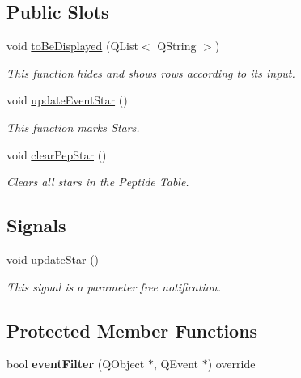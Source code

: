 \subsection*{Public Slots}
\begin{DoxyCompactItemize}
\item 
void \mbox{\hyperlink{class_peptide_view_a44ff37ec18e1e1c61c8747b6fe79e076}{to\+Be\+Displayed}} (Q\+List$<$ Q\+String $>$)
\begin{DoxyCompactList}\small\item\em This function hides and shows rows according to its input. \end{DoxyCompactList}\item 
void \mbox{\hyperlink{class_peptide_view_ab96162d2cb5e04591e6225505afceefe}{update\+Event\+Star}} ()
\begin{DoxyCompactList}\small\item\em This function marks Stars. \end{DoxyCompactList}\item 
\mbox{\label{class_peptide_view_ab2e4b1c394cd47afec35baceedf8be07}} 
void \mbox{\hyperlink{class_peptide_view_ab2e4b1c394cd47afec35baceedf8be07}{clear\+Pep\+Star}} ()
\begin{DoxyCompactList}\small\item\em Clears all stars in the Peptide Table. \end{DoxyCompactList}\end{DoxyCompactItemize}
\subsection*{Signals}
\begin{DoxyCompactItemize}
\item 
\mbox{\label{class_peptide_view_acaeeae28c65e40998f8b9f5eaf829f71}} 
void \mbox{\hyperlink{class_peptide_view_acaeeae28c65e40998f8b9f5eaf829f71}{update\+Star}} ()
\begin{DoxyCompactList}\small\item\em This signal is a parameter free notification. \end{DoxyCompactList}\end{DoxyCompactItemize}
\subsection*{Protected Member Functions}
\begin{DoxyCompactItemize}
\item 
\mbox{\label{class_peptide_view_a6c451e673bc3e13c3dfe1de10505f567}} 
bool {\bfseries event\+Filter} (Q\+Object $\ast$, Q\+Event $\ast$) override
\end{DoxyCompactItemize}


